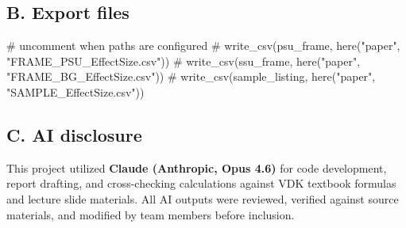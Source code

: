 \documentclass[
  11pt,
]{article}
\newenvironment{Shaded}{\begin{snugshade}}{\end{snugshade}}
\newcommand{\CommentTok}[1]{\textcolor[rgb]{0.37,0.37,0.37}{#1}}
\begin{document}
\subsection{B. Export files}\label{b.-export-files}

\begin{Shaded}
\begin{Highlighting}[]
\CommentTok{\# uncomment when paths are configured}
\CommentTok{\# write\_csv(psu\_frame, here("paper", "FRAME\_PSU\_EffectSize.csv"))}
\CommentTok{\# write\_csv(ssu\_frame, here("paper", "FRAME\_BG\_EffectSize.csv"))}
\CommentTok{\# write\_csv(sample\_listing, here("paper", "SAMPLE\_EffectSize.csv"))}
\end{Highlighting}
\end{Shaded}

\subsection{C. AI disclosure}\label{c.-ai-disclosure}

This project utilized \textbf{Claude (Anthropic, Opus 4.6)} for code
development, report drafting, and cross-checking calculations against
VDK textbook formulas and lecture slide materials. All AI outputs were
reviewed, verified against source materials, and modified by team
members before inclusion.
\end{document}
